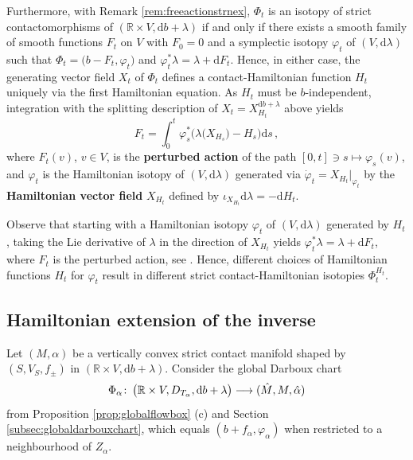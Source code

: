 \documentclass{amsart}
\theoremstyle{definition}
\def\co{\colon\thinspace}
\newcommand{\rmd}{\mathrm d}
\newcommand{\R}{\mathbb R}
\newcommand{\lra}{\longrightarrow}
\begin{document}
Furthermore,
with Remark \ref{rem:freeactionstrnex},
$\Phi_t$ is an isotopy of strict contactomorphisms
of $(\R\times V,\rmd b+\lambda)$
if and only if
there exists a smooth family of smooth functions $F_t$ on $V$
with $F_0=0$
and a symplectic isotopy $\varphi_t$ of $(V,\rmd\lambda)$
such that
$\Phi_t=\big(b-F_t,\varphi_t\big)$ and
$\varphi_t^*\lambda=\lambda+\rmd F_t$.
Hence, in either case,
the generating vector field $X_t$ of $\Phi_t$
defines a contact-Hamiltonian function $H_t$
uniquely via the first Hamiltonian equation.
As $H_t$ must be $b$-independent,
integration with the splitting description
of $X_t=X_{H_t}^{\rmd b+\lambda}$ above yields
\[
F_t=\int_0^t
  \varphi_s^*
  \Big(
    \lambda\big(X_{H_s}\big)-H_s
  \Big)
\rmd s
\,,
\]
where $F_t(v)$, $v\in V$, is the {\bf perturbed action}
of the path $[0,t]\ni s\mapsto\varphi_s(v)$,
and
$\varphi_t$ is the Hamiltonian isotopy of $(V,\rmd\lambda)$
generated via $\dot\varphi_t=X_{H_t}|_{\varphi_t}$
by the {\bf Hamiltonian vector field} $X_{H_t}$
defined by $\iota_{X_{H_t}}\rmd\lambda=-\rmd H_t$.

Observe that
starting with a Hamiltonian isotopy
$\varphi_t$ of $(V,\rmd\lambda)$ generated by $H_t$,
taking the Lie derivative of $\lambda$
in the direction of $X_{H_t}$ yields
$\varphi_t^*\lambda=\lambda+\rmd F_t$,
where $F_t$ is the perturbed action,
see \cite[Proposition~9.3.1]{mcdsal17}.
Hence,
different choices of Hamiltonian functions $H_t$ for $\varphi_t$
result in different strict contact-Hamiltonian isotopies $\Phi_t^{H_t}$.



\subsection{Hamiltonian extension of the inverse}
\label{subsec:hamexofinv}


Let $(M,\alpha)$ be a vertically convex
strict contact manifold
shaped by $(S,V_S,f_{\pm})$
in $(\R\times V,\rmd b+\lambda)$.
Consider the global Darboux chart
\[
 \Phi_{\alpha}\co
 \big(\R\times V,D_{T_{\alpha}},\rmd b+\lambda\big)
 \lra
 (\hat{M},M,\hat{\alpha})
\]
from Proposition \ref{prop:globalflowbox} (c)
and Section \ref{subsec:globaldarbouxchart},
which equals $(b+f_{\alpha},\varphi_{\alpha})$
when restricted to a neighbourhood of $Z_{\alpha}$.
\end{document}
